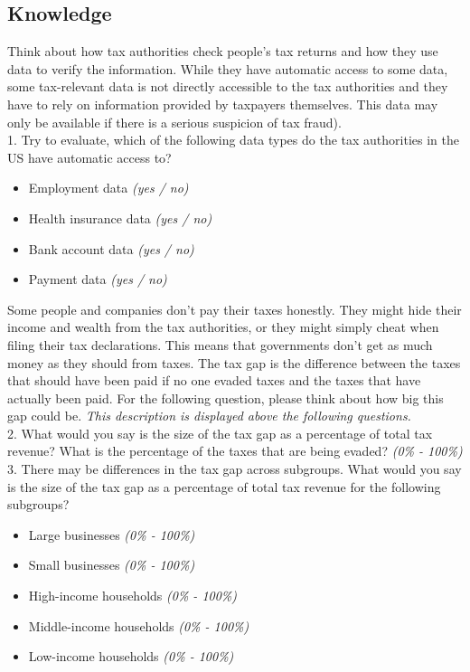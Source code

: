 \documentclass[11pt]{article}
\begin{document}
\subsection*{Knowledge}
Think about how tax authorities check people's tax returns and how they use data to verify the information. While they have automatic access to some data, some tax-relevant data is not directly accessible to the tax authorities and they have to rely on information provided by taxpayers themselves. This data may only be available if there is a serious suspicion of tax fraud). \\[0.5em] 
1. Try to evaluate, which of the following data types do the tax authorities in the US have automatic access to?
\begin{itemize}
    \item Employment data \textit{(yes / no)}
    \item Health insurance data \textit{(yes / no)}
    \item Bank account data \textit{(yes / no)}
    \item Payment data \textit{(yes / no)}
\end{itemize} 
Some people and companies don't pay their taxes honestly. They might hide their income and wealth from the tax authorities, or they might simply cheat when filing their tax declarations. This means that governments don't get as much money as they should from taxes. The tax gap is the difference between the taxes that should have been paid if no one evaded taxes and the taxes that have actually been paid. For the following question, please think about how big this gap could be. \textit{This description is displayed above the following questions.} \\[0.5em]
2. What would you say is the size of the tax gap as a percentage of total tax revenue? What is the percentage of the taxes that are being evaded? \textit{(0\% - 100\%)} \\[0.5em]
3. There may be differences in the tax gap across subgroups. What would you say is the size of the tax gap as a percentage of total tax revenue for the following subgroups? 
\begin{itemize}
    \item Large businesses \textit{(0\% - 100\%)}
    \item Small businesses \textit{(0\% - 100\%)}
    \item High-income households \textit{(0\% - 100\%)}
    \item Middle-income households \textit{(0\% - 100\%)}
    \item Low-income households \textit{(0\% - 100\%)}
\end{itemize}
\end{document}
